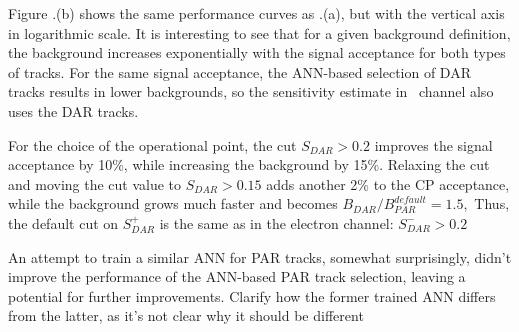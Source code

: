 Figure \strike{\ref{fig:mumem_ann_operational_point_choice}}{\blue \ref{fig:mumep_trq_ann}}.(b) shows the same performance curves
as \strike{\ref{fig:mumem_ann_operational_point_choice}}{\blue \ref{fig:mumep_trq_ann}}.(a), but with the vertical axis in logarithmic scale.
It is interesting to see\strike{,} that for {\blue a} given background definition, the background increases exponentially
with the signal acceptance for both types of tracks.
For the same signal acceptance, the ANN-based selection of DAR tracks results in lower
background{\blue s}, so the sensitivity estimate in \MuToEp\ channel also uses the DAR tracks. 

 {\blue For} the choice of the operational point, {\blue the} cut $S_{DAR} > 0.2$ improves the signal acceptance
by 10\%, while increasing the background by 15\%. Relaxing the cut and moving the cut value
to $S_{DAR} > 0.15$ adds another 2\% to the CP acceptance, while the background grows much faster
and becomes $B_{DAR}/B_{PAR}^{default} = 1.5,$
Thus, the default cut on  {\blue $S_{DAR}^+$} is the same as in the electron channel:  $S_{DAR}^- > 0.2$

An attempt to train a similar ANN for PAR tracks, somewhat surprisingly, didn't improve the performance
of the ANN-based PAR track selection, leaving a potential for further improvements. 
{\blue Clarify how the former trained ANN differs from the latter, as it's not clear why it should be different}

